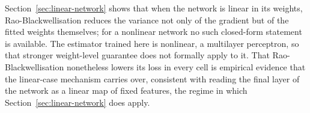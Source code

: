 Section~\ref{sec:linear-network} shows that when the network is
linear in its weights, Rao-Blackwellisation reduces the variance not
only of the gradient but of the fitted weights themselves; for a
nonlinear network no such closed-form statement is available. The
estimator trained here is nonlinear, a multilayer perceptron, so that
stronger weight-level guarantee does not formally apply to it. That
Rao-Blackwellisation nonetheless lowers its loss in every cell is
empirical evidence that the linear-case mechanism carries over,
consistent with reading the final layer of the network as a linear
map of fixed features, the regime in which
Section~\ref{sec:linear-network} does apply. 